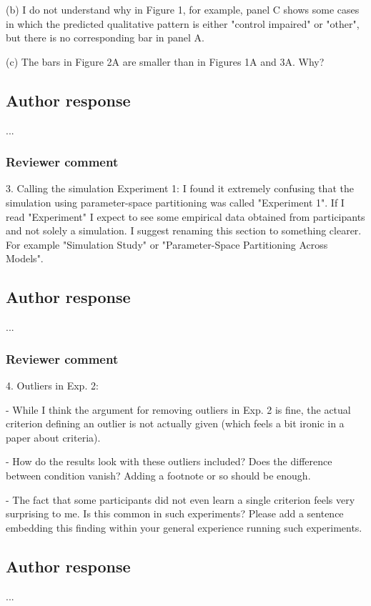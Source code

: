 \documentclass[12pt]{article}
\begin{document}
(b) I do not understand why in Figure 1, for example, panel
C shows some cases in which the predicted qualitative
pattern is either "control impaired" or "other", but there
is no corresponding bar in panel A.

(c) The bars in Figure 2A are smaller than in Figures 1A and
3A. Why?

\subsection{Author response}
...

\subsubsection{Reviewer comment}
3. Calling the simulation Experiment 1: I found it extremely
confusing that the simulation using parameter-space
partitioning was called "Experiment 1". If I read
"Experiment" I expect to see some empirical data obtained
from participants and not solely a simulation. I suggest
renaming this section to something clearer. For example
"Simulation Study" or "Parameter-Space Partitioning Across
Models".

\subsection{Author response}
...

\subsubsection{Reviewer comment}
4. Outliers in Exp. 2:

- While I think the argument for removing outliers in Exp. 2
is fine, the actual criterion defining an outlier is not
actually given (which feels a bit ironic in a paper about
criteria).

- How do the results look with these outliers included? Does
the difference between condition vanish? Adding a footnote
or so should be enough.

- The fact that some participants did not even learn a
single criterion feels very surprising to me. Is this common
in such experiments? Please add a sentence embedding this
finding within your general experience running such
experiments.

\subsection{Author response}
...
\end{document}
